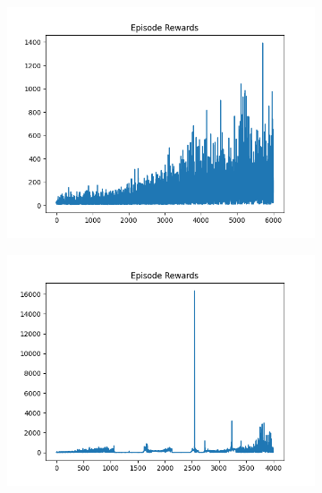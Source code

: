 \begin{figure}[H]
\begin{subfigure}{.47\linewidth}
        \includegraphics[width=\textwidth]{pole/2024-06-14_00-20-45_dqn_cartpole_episode_rewards.png}
    \end{subfigure}
    \begin{subfigure}{.47\linewidth}
        \centering
        \includegraphics[width=\textwidth]{pole/2024-06-14_13-24-09_dqn_cartpole_episode_rewards.png}
    \end{subfigure}
\end{figure}
